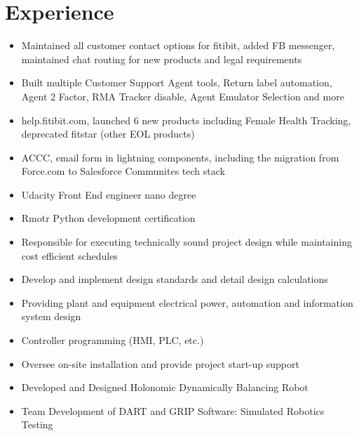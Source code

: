 \documentclass[10.5pt,letterpaper,sans]{moderncv}        %
\begin{document}
\makecvtitle

\vspace{-15mm}

\section{Experience}

\begin{itemize}
\item Maintained all customer contact options for fitibit, added FB messenger, maintained chat routing for new products and legal requirements
\item Built multiple Customer Support Agent tools, Return label automation, Agent 2 Factor, RMA Tracker disable, Agent Emulator Selection and more
\item help.fitibit.com, launched 6 new products including Female Health Tracking, deprecated fitstar (other EOL products)
\item ACCC, email form in lightning components, including the migration from Force.com to Salesforce Communites tech stack
\end{itemize}

\begin{itemize}
\item Udacity Front End engineer nano degree
\item Rmotr Python development certification
\end{itemize}

\begin{itemize}
\item Responsible for executing technically sound project design while maintaining cost efficient schedules
\item Develop and implement design standards and detail design calculations
\item Providing plant and equipment electrical power, automation and information system design
\item Controller programming (HMI, PLC, etc.)
\item Oversee on-site installation and provide project start-up support
\end{itemize}

\begin{itemize}
\item Developed and Designed Holonomic Dynamically Balancing Robot
\item Team Development of DART and GRIP Software: Simulated Robotics Testing
\end{itemize}
\end{document}

